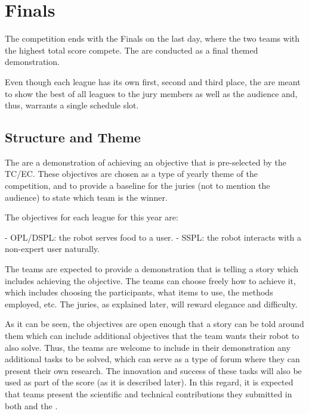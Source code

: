 \chapter{Finals}

The competition ends with the Finals on the last day, where the two teams with the highest total score compete.
The  are conducted as a final themed demonstration.


Even though each league has its own first, second and third place, the  are meant to show the best of all leagues to the jury members as well as the audience and, thus, warrants a single schedule slot.

\section{Structure and Theme}

The  are a demonstration of achieving an objective that is pre-selected by the TC/EC. These objectives are chosen as a type of yearly theme of the competition, and to provide a baseline for the juries (not to mention the audience) to state which team is the winner.

The objectives for each league for this year are:

- OPL/DSPL: the robot serves food to a user.
- SSPL: the robot interacts with a non-expert user naturally.

The teams are expected to provide a demonstration that is telling a story which includes achieving the objective. The teams can choose freely how to achieve it, which includes choosing the participants, what items to use, the methods employed, etc. The juries, as explained later, will reward elegance and difficulty.

As it can be seen, the objectives are open enough that a story can be told around them which can include additional objectives that the team wants their robot to also solve. Thus, the teams are welcome to include in their demonstration any additional tasks to be solved, which can serve as a type of forum where they can present their own research. The innovation and success of these tasks will also be used as part of the score (as it is described later). In this regard, it is expected that teams present the scientific and technical contributions they submitted in both  and the .

